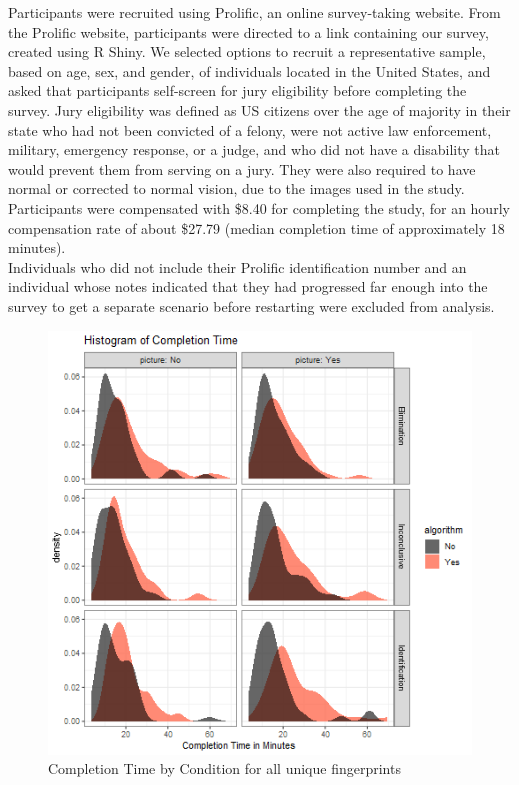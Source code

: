 \documentclass[print]{nuthesis}
\begin{document}
Participants were recruited using Prolific, an online survey-taking website.
From the Prolific website, participants were directed to a link containing our survey, created using R Shiny.
We selected options to recruit a representative sample, based on age, sex, and gender, of individuals located in the United States, and asked that participants self-screen for jury eligibility before completing the survey.
Jury eligibility was defined as US citizens over the age of majority in their state who had not been convicted of a felony, were not active law enforcement, military, emergency response, or a judge, and who did not have a disability that would prevent them from serving on a jury.
They were also required to have normal or corrected to normal vision, due to the images used in the study.
Participants were compensated with \$8.40 for completing the study, for an hourly compensation rate of about \$27.79 (median completion time of approximately 18 minutes).\\
Individuals who did not include their Prolific identification number and an individual whose notes indicated that they had progressed far enough into the survey to get a separate scenario before restarting were excluded from analysis.

\begin{figure}

{\centering \includegraphics[width=\linewidth]{images/completiontime} 

}

\caption{Completion Time by Condition for all unique fingerprints}\label{fig:completiontime}
\end{figure}
\end{document}
